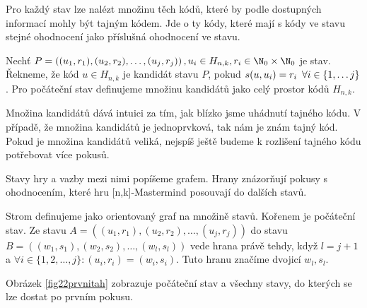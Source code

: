Pro každý stav lze nalézt množinu těch kódů, které by podle dostupných informací mohly být tajným kódem. Jde o ty kódy, které mají s kódy ve stavu stejné ohodnocení jako příslušná ohodnocení ve stavu. 

\begin{definice}[kandidát]\label{kandidat}
  Nechť $P = \left((u_1, r_1), (u_2,r_2), \dots, (u_j,r_j)\right), u_i \in H_{n,k}, r_i \in \N _0 \times \N _0$ je stav. Řekneme, že kód $u \in H_{n,k}$ je kandidát stavu $P$, pokud $s(u,u_i) = r_i \hspace{5px} \forall i \in \{1, \dots j\}$. Pro počáteční stav definujeme množinu kandidátů jako celý prostor kódů $H_{n,k}$.

\end{definice}
Množina kandidátů dává intuici za tím, jak blízko jsme uhádnutí tajného kódu. V případě, že množina kandidátů je jednoprvková, tak nám je znám tajný kód. Pokud je množina kandidátů veliká, nejspíš ještě budeme k rozlišení tajného kódu potřebovat více pokusů.

Stavy hry a vazby mezi nimi popíšeme grafem. Hrany znázorňují pokusy s ohodnocením, které hru [n,k]-Mastermind posouvají do dalších stavů. 
\begin{definice}
  Strom  definujeme jako orientovaný graf na množině stavů. Kořenem je počáteční stav. Ze stavu $A = \left((u_1, r_1), (u_2,r_2), \dots, (u_j,r_j)\right)$ do stavu $B = \left((w_1, s_1), (w_2,s_2), \dots, (w_l,s_l)\right)$ vede hrana právě tehdy, když $l = j+1$ a $\forall i \in \{1,2,\dots, j\} \colon (u_i, r_i) = (w_i, s_i)$. Tuto hranu značíme dvojicí $w_l, s_l$. 
\end{definice}

Obrázek \ref{fig22prvnitah} zobrazuje počáteční stav a všechny stavy, do kterých se lze dostat po prvním pokusu. 


